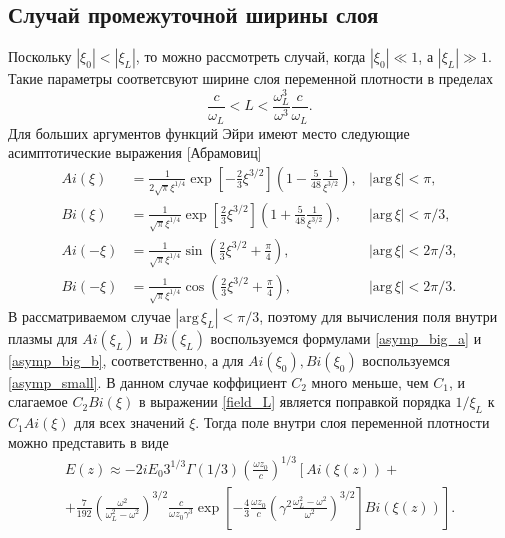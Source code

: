 \documentclass[12pt,a4paper]{article}
\numberwithin{equation}{section}
\begin{document}
\subsection{Случай промежуточной ширины слоя}
Поскольку $|\xi_0|<|\xi_L|$, то можно рассмотреть случай, когда $|\xi_0|\ll 1$, а $|\xi_L| \gg 1$. Такие параметры соответсвуют ширине слоя переменной плотности в пределах 
\begin{equation}
    \label{cond2}
    \frac{c}{\omega_L}<L<\frac{\omega_L^3}{\omega^3} \frac{c}{\omega_L}.
\end{equation}
Для больших аргументов функций Эйри имеют место следующие асимптотические выражения [Абрамовиц]
\begin{subequations}
\label{asymp_big}
\begin{align}
    Ai\left(\xi\right) &= \frac{1}{2\sqrt{\pi}\xi^{1/4}}\exp\left[-\frac{2}{3}\xi^{3/2}\right]\left(1-\frac{5}{48}\frac{1}{\xi^{3/2}}\right),& |\text{arg}\,\xi| <\pi, \label{asymp_big_a}
    \\ Bi\left(\xi\right) &= \frac{1}{\sqrt{\pi}\xi^{1/4}}\exp\left[\frac{2}{3}\xi^{3/2}\right]\left(1+\frac{5}{48}\frac{1}{\xi^{3/2}}\right),& |\text{arg}\, \xi| <\pi/3, \label{asymp_big_b}\\ 
    Ai\left(-\xi\right) &= \frac{1}{\sqrt{\pi}\xi^{1/4}}\sin\left(\frac{2}{3}\xi^{3/2}+\frac{\pi}{4}\right),& |\text{arg}\, \xi| <2\pi/3, \label{asymp_big_c} \\
    Bi\left(-\xi\right) &= \frac{1}{\sqrt{\pi}\xi^{1/4}}\cos\left(\frac{2}{3}\xi^{3/2}+\frac{\pi}{4}\right),& |\text{arg}\,\xi| <2\pi/3. \label{asymp_big_d}
\end{align}
\end{subequations}
В рассматриваемом случае $|\text{arg}\, \xi_L| <\pi/3$, поэтому для вычисления поля внутри плазмы для $Ai\left(\xi_L\right)$ и $Bi\left(\xi_L\right)$ воспользуемся формулами \eqref{asymp_big_a} и \eqref{asymp_big_b}, соответственно, а для $Ai\left(\xi_0\right), Bi\left(\xi_0\right)$ воспользуемся \eqref{asymp_small}. В данном случае коффициент $C_2$ много меньше, чем $C_1$, и слагаемое $C_2Bi\left(\xi\right)$ в выражении \eqref{field_L} является поправкой порядка $1/\xi_L$ к $C_1Ai\left(\xi\right)$ для всех значений $\xi$. Тогда поле внутри слоя переменной плотности можно представить в виде
\begin{eqnarray}
    E\left(z\right)\approx -2i E_0 3^{1/3} \Gamma\left(1/3\right)\left(\frac{\omega z_0}{c}\right)^{1/3}\left[ Ai\left(\xi\left(z\right)\right)+ \nonumber\right. \\
    +\left.\frac{7}{192}\left(\frac{\omega^2}{\omega_L^2-\omega^2}\right)^{3/2}\frac{c}{\omega z_0 \gamma^3}\exp\left[-\frac{4}{3}\frac{\omega z_0}{c}\left(\gamma^2\frac{\omega_L^2-\omega^2}{\omega^2}\right)^{3/2}\right]Bi\left(\xi\left(z\right)\right)\right]. 
    \label{E1_med}
\end{eqnarray}
\end{document}

